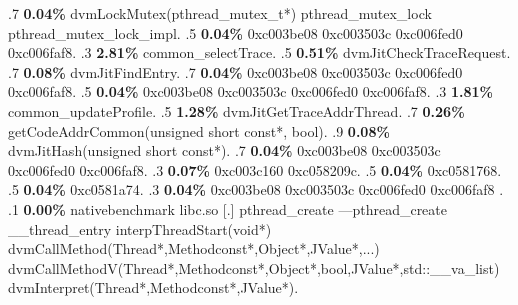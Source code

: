 \begin{profile}
{.7 \textbf{0.04\%} dvmLockMutex(pthread\_mutex\_t*)\newline {} pthread\_mutex\_lock\newline {} pthread\_mutex\_lock\_impl. 
.5 \textbf{0.04\%} 0xc003be08\newline {} 0xc003503c\newline {} 0xc006fed0\newline {} 0xc006faf8. 
.3 \textbf{2.81\%} common\_selectTrace. 
.5 \textbf{0.51\%} dvmJitCheckTraceRequest. 
.7 \textbf{0.08\%} dvmJitFindEntry. 
.7 \textbf{0.04\%} 0xc003be08\newline {} 0xc003503c\newline {} 0xc006fed0\newline {} 0xc006faf8. 
.5 \textbf{0.04\%} 0xc003be08\newline {} 0xc003503c\newline {} 0xc006fed0\newline {} 0xc006faf8. 
.3 \textbf{1.81\%} common\_updateProfile. 
.5 \textbf{1.28\%} dvmJitGetTraceAddrThread. 
.7 \textbf{0.26\%} getCodeAddrCommon(unsigned short const*, bool). 
.9 \textbf{0.08\%} dvmJitHash(unsigned short const*). 
.7 \textbf{0.04\%} 0xc003be08\newline {} 0xc003503c\newline {} 0xc006fed0\newline {} 0xc006faf8. 
.3 \textbf{0.07\%} 0xc003c160\newline {} 0xc058209c. 
.5 \textbf{0.04\%} 0xc0581768. 
.5 \textbf{0.04\%} 0xc0581a74. 
.3 \textbf{0.04\%} 0xc003be08\newline {} 0xc003503c\newline {} 0xc006fed0\newline {} 0xc006faf8\newline {} . 
.1 \textbf{ 0.00\%} nativebenchmark  libc.so                [.] pthread\_create\newline {} ---pthread\_create\newline {} \_\_thread\_entry\newline {} interpThreadStart(void*)\newline {} dvmCallMethod(Thread*,Methodconst*,Object*,JValue*,...)\newline {} dvmCallMethodV(Thread*,Methodconst*,Object*,bool,JValue*,std::\_\_va\_list)\newline {} dvmInterpret(Thread*,Methodconst*,JValue*). 
}
\end{profile}
